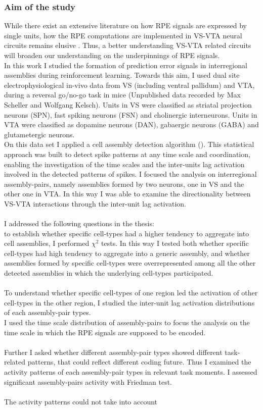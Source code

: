 \subsubsection{Aim of the study}
While there exist an extensive literature on how RPE signals are expressed by single units, how the RPE computations are implemented in VS-VTA neural circuits remains elusive \cite{Schultz2016}. Thus, a better understanding VS-VTA related circuits will broaden our understanding on the underpinnings of RPE signals.\\In this work I studied the formation of prediction error signals in interregional assemblies during reinforcement learning. Towards this aim, I used dual site electrophysiological in-vivo data from VS (including ventral pallidum) and VTA, during a reversal go/no-go task in mice (Unpublished data recorded by Max Scheller and Wolfgang Kelsch). Units in VS were classified as striatal projection neurons (SPN), fast spiking neurons (FSN) and cholinergic interneurons. Units in VTA were classified as dopamine neurons (DAN), gabaergic neurons (GABA) and glutametergic neurons.\\On this data set I applied a cell assembly detection algorithm (\cite{RussoDurstewitz}). This statistical approach was built to detect spike patterns at any time scale and coordination, enabling the investigation of the time scales and the inter-units lag activation involved in the detected patterns of spikes. I focused the analysis on interregional assembly-pairs, namely assemblies formed by two neurons, one in VS and the other one in VTA. In this way I was able to examine the directionality between VS-VTA interactions through the inter-unit lag activation.\\\\I addressed the following questions in the thesis:\\to establish whether specific cell-types had a higher tendency to aggregate into cell assemblies, I performed $\chi^2$ tests. In this way I tested both whether specific cell-types had high tendency to aggregate into a generic assembly, and whether assemblies formed by specific cell-types were overrepresented among all the other detected assemblies in which the underlying cell-types participated.\\\\To understand whether specific cell-types of one region led the activation of other cell-types in the other region, I studied the inter-unit lag activation distributions of each assembly-pair types.\\I used the time scale distribution of assembly-pairs to focus the analysis on the time scale in which the RPE signals are supposed to be encoded.\\\\Further I asked whether different assembly-pair types showed different task-related patterns, that could reflect different coding future. Thus I examined the activity patterns of each assembly-pair types in relevant task moments. I assessed significant assembly-pairs activity with Friedman test.\\\\The activity patterns could not take into account 
